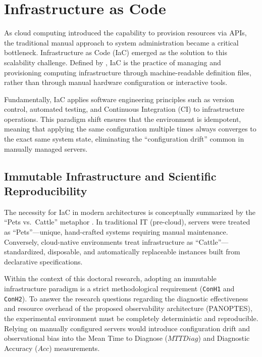 \section{Infrastructure as Code}
\label{sec:iac}

As cloud computing introduced the capability to provision resources via APIs, the traditional manual approach to system administration became a critical bottleneck. Infrastructure as Code (IaC) emerged as the solution to this scalability challenge. Defined by , IaC is the practice of managing and provisioning computing infrastructure through machine-readable definition files, rather than through manual hardware configuration or interactive tools.

Fundamentally, IaC applies software engineering principles such as version control, automated testing, and Continuous Integration (CI) to infrastructure operations. This paradigm shift ensures that the environment is idempotent, meaning that applying the same configuration multiple times always converges to the exact same system state, eliminating the ``configuration drift'' common in manually managed servers.

\subsection{Immutable Infrastructure and Scientific Reproducibility}
\label{subsec:pets-vs-cattle}

The necessity for IaC in modern architectures is conceptually summarized by the ``Pets vs.\ Cattle'' metaphor \cite{bias_2016}. In traditional IT (pre-cloud), servers were treated as ``Pets''---unique, hand-crafted systems requiring manual maintenance. Conversely, cloud-native environments treat infrastructure as ``Cattle''---standardized, disposable, and automatically replaceable instances built from declarative specifications.

Within the context of this doctoral research, adopting an immutable infrastructure paradigm is a strict methodological requirement (\texttt{ConH1} and \texttt{ConH2}). To answer the research questions regarding the diagnostic effectiveness and resource overhead of the proposed observability architecture (PANOPTES), the experimental environment must be completely deterministic and reproducible. Relying on manually configured servers would introduce configuration drift and observational bias into the Mean Time to Diagnose ($MTTDiag$) and Diagnostic Accuracy ($Acc$) measurements.

